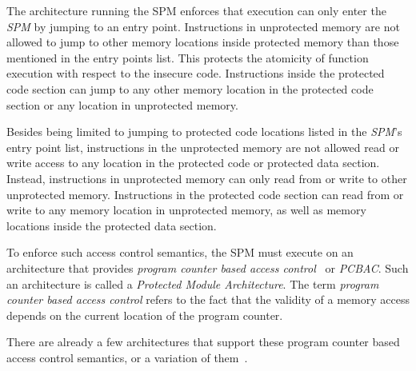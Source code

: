 The architecture running the SPM enforces that execution can only enter the \emph{SPM} by jumping to an entry point.
Instructions in unprotected memory are not allowed to jump to other memory locations inside protected memory than those mentioned in the entry points list.
This protects the atomicity of function execution with respect to the insecure code.
Instructions inside the protected code section can jump to any other memory location in the protected code section or any location in unprotected memory.

Besides being limited to jumping to protected code locations listed in the \emph{SPM}'s entry point list, instructions in the unprotected memory are not allowed read or write access to any location in the protected code or protected data section.
Instead, instructions in unprotected memory can only read from or write to other unprotected memory.
Instructions in the protected code section can read from or write to any memory location in unprotected memory, as well as memory locations inside the protected data section.


%

To enforce such access control semantics, the SPM must execute on an architecture that provides \emph{program counter based access control}~\cite{PCBAC} or \emph{PCBAC}.
Such an architecture is called a \emph{Protected Module Architecture}.
The term \emph{program counter based access control} refers to the fact that the validity of a memory access depends on the current location of the program counter.

There are already a few architectures that support these program counter based access control semantics, or a variation of them~\cite{Fides, Salus, Sancus, SGX}.

